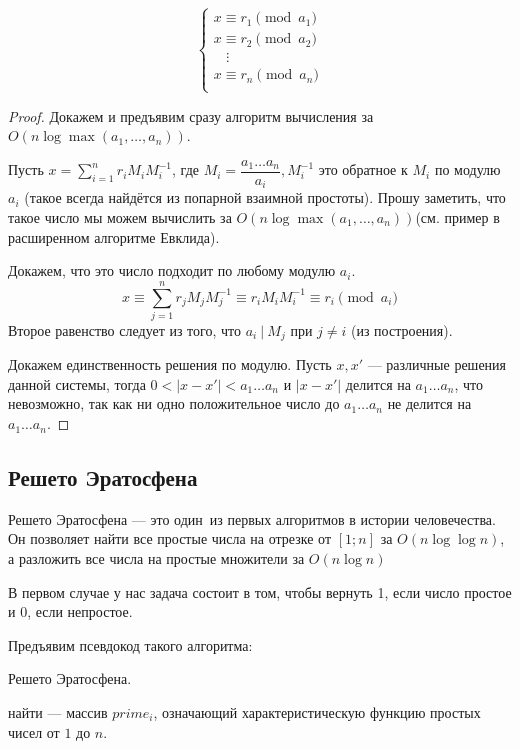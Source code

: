 \documentclass[a4paper, 12pt]{article}
\begin{document}
\[
  \begin{cases}
    x \equiv r_1 \pmod{a_1} \\
    x \equiv r_2 \pmod{a_2} \\
    ~~~~\vdots \\
    x \equiv r_n \pmod{a_n} \\
  \end{cases}
\]

\begin{proof}
  Докажем и предъявим сразу алгоритм вычисления за $O(n \log \max(a_1, \ldots, a_n))$.

  Пусть $x = \sum\limits_{i = 1}^n r_i M_i M_i^{-1}$, где $M_i = \dfrac{a_1\ldots a_n}{a_i},
  M_i^{-1}$ это обратное к $M_i$ по модулю $a_i$ (такое всегда найдётся из
  попарной взаимной простоты). Прошу заметить, что такое
  число мы можем вычислить за $O(n \log \max(a_1, \ldots, a_n))$(см. пример в 
  расширенном алгоритме Евклида). 

  Докажем, что это число подходит по любому модулю $a_i$.
  \[
    x \equiv \sum\limits_{j = 1}^n r_jM_jM_j^{-1} \equiv r_iM_iM_i^{-1} \equiv r_i \pmod{a_i}
  \]
  Второе равенство следует из того, что $a_i \ | \ M_j$ при $j \neq i$ (из построения).

  Докажем единственность решения по модулю. Пусть $x, x'$ --- различные решения
  данной системы, тогда $0<|x - x'| < a_1 \ldots a_n$ и $|x  - x'|$ делится
  на $a_1 \ldots a_n$, что невозможно, так как ни одно положительное число до
  $a_1 \ldots a_n$ не делится на $a_1 \ldots a_n$.
\end{proof}

\subsection{Решето Эратосфена}

Решето Эратосфена --- это один~из первых алгоритмов в истории человечества. Он
позволяет найти все простые числа на отрезке от $[1; n]$ за $O(n\log\log n)$, а
разложить все числа на простые множители за $O(n\log n)$

В первом случае у нас задача состоит в том, чтобы вернуть 1, если число простое 
и 0, если непростое.

Предъявим псевдокод такого алгоритма:

\begin{algorithm}
  \caption{Решето Эратосфена.}
  \begin{algorithmic}[1]
     \Comment найти --- массив $prime_i$,
    означающий характеристическую функцию простых чисел от $1$ до $n$.
    \EndFor
        \EndWhile
      \EndIf
    \EndFor
    \EndFunction
  \end{algorithmic}
\end{algorithm}
\end{document}
